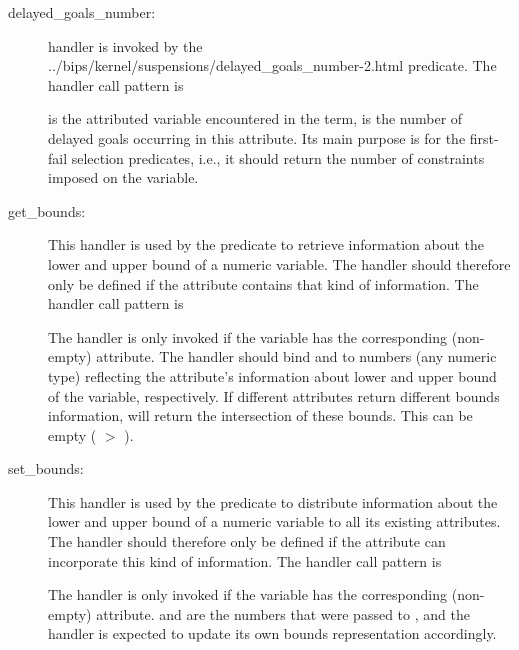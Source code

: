 \begin{description}
\item [delayed_goals_number:]
  handler is invoked by the
%
{../bips/kernel/suspensions/delayed_goals_number-2.html}
predicate.
The handler call pattern is
\begin{quote}
\end{quote}
 is the attributed variable encountered in the
term,  is the number of delayed
goals occurring in this attribute.
Its main purpose is for the first-fail selection predicates,
i.e., it should return the number of constraints imposed on
the variable.

\item [get_bounds:]
    This handler is used by the predicate
    to retrieve information about the lower and upper bound of a numeric
    variable.
    The handler should therefore only be defined if the attribute contains
    that kind of information. The handler call pattern is
    \begin{quote}
    \end{quote}
    The handler is only invoked if the variable has the corresponding
    (non-empty) attribute.
    The handler should bind  and  to numbers
    (any numeric type) reflecting the attribute's information about lower
    and upper bound of the variable, respectively.
    If different attributes return different bounds information,
    will return the intersection of these bounds. This can be empty
    ( $>$ ).

\item [set_bounds:]
    This handler is used by the predicate
    to distribute information about the lower and upper bound of a numeric
    variable to all its existing attributes.
    The handler should therefore only be defined if the attribute can
    incorporate this kind of information. The handler call pattern is
    \begin{quote}
    \end{quote}
    The handler is only invoked if the variable has the corresponding
    (non-empty) attribute.
     and  are the numbers that were passed to
    ,
    and the handler is expected to update its
    own bounds representation accordingly.




\end{description}
